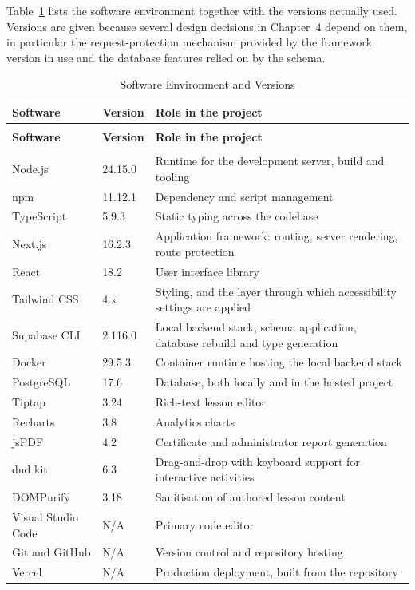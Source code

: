 \documentclass[12pt, oneside]{article} %
\newcommand{\tabbreak}{\hyphenpenalty=200\exhyphenpenalty=200\tolerance=4000\hbadness=10000\hspace{0pt}}
\begin{document}
Table~\ref{tab:dev_software} lists the software environment together with the versions actually used. Versions are given because several design decisions in Chapter~4 depend on them, in particular the request-protection mechanism provided by the framework version in use and the database features relied on by the schema.

{
\renewcommand{\arraystretch}{1.2}
\footnotesize
\begin{longtable}{|>{\raggedright\arraybackslash\tabbreak}p{3.07cm}|>{\raggedright\arraybackslash\tabbreak}p{2.33cm}|>{\raggedright\arraybackslash\tabbreak}p{7.82cm}|}
\caption{Software Environment and Versions}
\label{tab:dev_software}\\
\hline
\textbf{Software} & \textbf{Version} & \textbf{Role in the project} \\
\hline \hline
\endfirsthead
\multicolumn{3}{l}{\footnotesize\itshape Table~\ref{tab:dev_software} continued from the previous page}\\
\hline
\textbf{Software} & \textbf{Version} & \textbf{Role in the project} \\
\hline \hline
\endhead
\hline
\multicolumn{3}{r}{\footnotesize\itshape continued on the next page}\\
\endfoot
\endlastfoot
Node.js & 24.15.0 & Runtime for the development server, build and tooling \\ \hline
npm & 11.12.1 & Dependency and script management \\ \hline
TypeScript & 5.9.3 & Static typing across the codebase \\ \hline
Next.js & 16.2.3 & Application framework: routing, server rendering, route protection \\ \hline
React & 18.2 & User interface library \\ \hline
Tailwind CSS & 4.x & Styling, and the layer through which accessibility settings are applied \\ \hline
Supabase CLI & 2.116.0 & Local backend stack, schema application, database rebuild and type generation \\ \hline
Docker & 29.5.3 & Container runtime hosting the local backend stack \\ \hline
PostgreSQL & 17.6 & Database, both locally and in the hosted project \\ \hline
Tiptap & 3.24 & Rich-text lesson editor \\ \hline
Recharts & 3.8 & Analytics charts \\ \hline
jsPDF & 4.2 & Certificate and administrator report generation \\ \hline
dnd kit & 6.3 & Drag-and-drop with keyboard support for interactive activities \\ \hline
DOMPurify & 3.18 & Sanitisation of authored lesson content \\ \hline
Visual Studio Code & N/A & Primary code editor \\ \hline
Git and GitHub & N/A & Version control and repository hosting \\ \hline
Vercel & N/A & Production deployment, built from the repository \\ \hline
\end{longtable}
}
\end{document}
